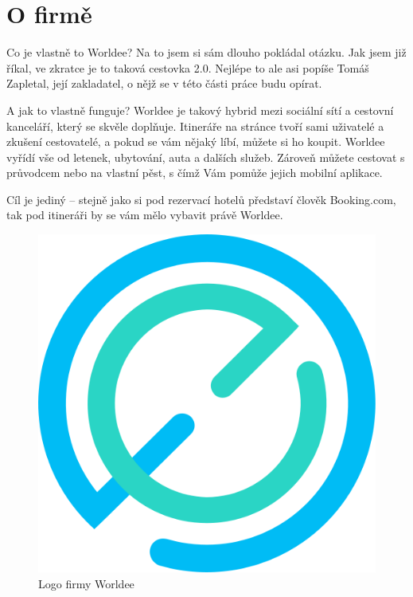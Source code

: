 \section{O firmě}

Co je vlastně to Worldee? Na to jsem si sám dlouho pokládal otázku. Jak jsem již říkal, ve zkratce je to taková cestovka 2.0. Nejlépe to ale asi popíše Tomáš Zapletal, její zakladatel, o nějž se v této části práce budu opírat.\cite{WorldeeInfo}

\begin{displayquote}
\end{displayquote}

A jak to vlastně funguje? Worldee je takový hybrid mezi sociální sítí a cestovní kanceláří, který se skvěle doplňuje. Itineráře na stránce tvoří sami uživatelé a zkušení cestovatelé, a pokud se vám nějaký líbí, můžete si ho koupit. Worldee vyřídí vše od letenek, ubytování, auta a dalších služeb. Zároveň můžete cestovat s průvodcem nebo na vlastní pěst, s čímž Vám pomůže jejich mobilní aplikace.

Cíl je jediný – stejně jako si pod rezervací hotelů představí člověk Booking.com, tak pod itineráři by se vám mělo vybavit právě Worldee.
\\
\begin{figure}[!h]
    \centering
    \includegraphics[width=0.3\linewidth]{obrazky/worldee.png}
    \caption[Logo firmy Worldee]{Logo firmy Worldee\cite{Worldee}}
\end{figure}
